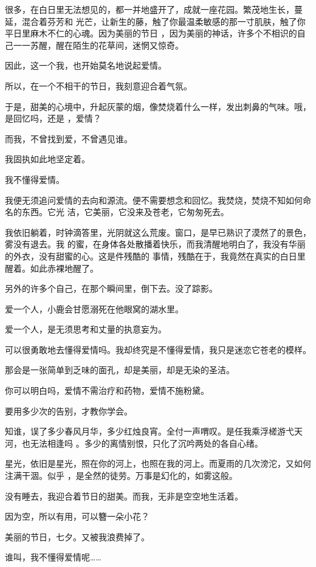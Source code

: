 \documentclass[12pt,a4paper]{article}
\begin{document}
		很多，在白日里无法想见的，都一并地盛开了，成就一座花园。繁茂地生长，蔓延，混合着芬芳和
	光芒，让新生的藤，触了你最温柔敏感的那一寸肌肤，触了你平日里麻木不仁的心魂。因为美丽的节日
	，因为美丽的神话，许多个不相识的自己一一苏醒，醒在陌生的花草间，迷惘又惊奇。

		因此，这一个我，也开始莫名地说起爱情。

		所以，在一个不相干的节日，我刻意迎合着气氛。

		于是，甜美的心境中，升起灰蒙的烟，像焚烧着什么一样，发出刺鼻的气味。哦，是回忆吗，还是
	，爱情？

		而我，不曾找到爱，不曾遇见谁。


		我固执如此地坚定着。

		我不懂得爱情。


		我便无须追问爱情的去向和源流。便不需要想念和回忆。我焚烧，焚烧不知如何命名的东西。它光
	洁，它美丽，它没来及苍老，它匆匆死去。


		我依旧躺着，时钟滴答里，光阴就这么荒废。窗口，是早已熟识了漠然了的景色，雾没有退去。我
	的蜜，在身体各处散播着快乐，而我清醒地明白了，我没有华丽的外衣，没有甜蜜的心。这是件残酷的
	事情，残酷在于，我竟然在真实的白日里醒着。如此赤裸地醒了。


		另外的许多个自己，在那个瞬间里，倒下去。没了踪影。

		爱一个人，小鹿会甘愿溺死在他眼窝的湖水里。

		爱一个人，是无须思考和丈量的执意妄为。

		可以很勇敢地去懂得爱情吗。我却终究是不懂得爱情，我只是迷恋它苍老的模样。

		那会是一张简单到乏味的面孔，却是美丽，却是无染的圣洁。

		你可以明白吗，爱情不需治疗和药物，爱情不施粉黛。

		要用多少次的告别，才教你学会。


		知谁，误了多少春风月华，多少红烛良宵。全付一声喟叹。是任我乘浮槎游弋天河，也无法相逢吗
	。多少的离情别恨，只化了沉吟两处的各自心绪。

		星光，依旧是星光，照在你的河上，也照在我的河上。而夏雨的几次滂沱，又如何注满干涸。似乎
	，是全然的徒劳。万事是幻化的，如雾这般。


		没有睡去，我迎合着节日的甜美。而我，无非是空空地生活着。

		因为空，所以有用，可以簪一朵小花？

		美丽的节日，七夕。又被我浪费掉了。

		谁叫，我不懂得爱情呢……

	\endwriting
\end{document}
